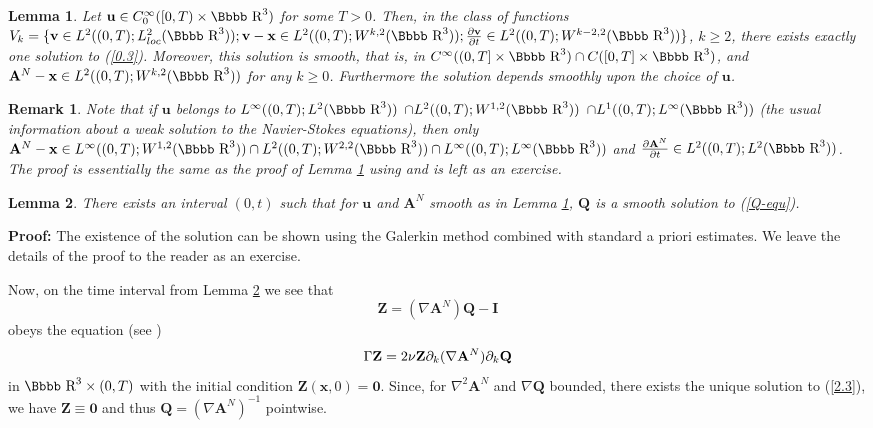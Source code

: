 \documentclass[12pt,twoside]{article}
\newcommand{\bZ}{\mathbf{Z}}
\newcommand{\bA}{\mathbf{A}}
\newtheorem{lema}{Lemma}[section]
\newtheorem{rema}{Remark}[section]
\newcommand {\rdd}{\mbox{\Bbbb R}}
\newcommand {\bnul}{{\mathbf {0}}}
\newcommand {\bv}{{\mathbf{v}}}
\newcommand {\bu}{{\mathbf{u}}}
\newcommand {\bI}{{\mathbf{I}}}
\newcommand {\bx}{{\mathbf{x}}}
\newcommand {\bQ}{{\mathbf{Q}}}
\newcommand {\pder}[2]{\frac {\partial #1}{\partial #2}}
\newcommand {\demo}{{\bf Proof:} }
\def\kondemo{\hfill \vrule width7pt height7pt depth0pt}
\newcommand{\wor}[2]{W^{#1,#2}(\rdd^3)}
\renewcommand{\lor}[1]{L^{#1}(\rdd^3)}
\begin{document}
\begin{lema} \label {l 2.1}
Let $\bu \in C^\infty_0([0,T)\times \rdd^3)$ for some $T>0$. Then,
in the class of functions $V_k= \{\bv \in L^2((0,T); L^{2}_{loc}(\rdd^3)); \bv-\bx
\in L^2((0,T); W^{k,2}(\rdd^3)); \pder{\bv}{t} \in L^2((0,T);
W^{k-2,2} (\rdd^3))\}$, $k\geq 2$, there 
exists exactly one solution to (\ref{0.3}).
Moreover, this solution
is smooth, that is, in $C^\infty((0,T]\times \rdd^3) \cap 
C([0,T]\times \rdd^3)$, 
and $\bA^N-\bx \in L^2((0,T);
\wor{k}{2})$ for any $k\geq 0$.  Furthermore the solution depends smoothly upon
the choice of $\bu$.
\end{lema}

\begin{rema} \label{r 2.1}
{\rm Note that if $\bu$ belongs to $L^\infty((0,T); \lor{2})$ 
$\cap L^2((0,T);
\wor{1}{2})$ $\cap L^1((0,T);
\lor{\infty})$ (the usual information about a weak solution to the 
Navier-Stokes equations), 
then only $\bA^N-\bx \in L^\infty((0,T);
\wor{1}{2}) \cap L^2((0,T);
\wor{2}{2}) \cap L^\infty((0,T);
\lor{\infty})$ and $\pder{\bA^N}{t} \in L^2((0,T);
\lor{2})$. The proof is essentially the same as the proof of Lemma 
\ref{l 2.1} using \cite{LaSoUr} and is left as an exercise. }
\end{rema}  


\begin{lema} \label{l 2.2}
There exists an interval $(0,t)$ such that for $\bu$ and $\bA^N$ smooth as in 
Lemma \ref{l 2.1}, $\bQ$ is a smooth solution to (\ref{Q-equ}).
\end{lema}

\demo The existence of the solution can be shown using the Galerkin
method combined with standard a priori estimates. We leave the details
of the proof to the reader as an exercise. 
\kondemo

\bigskip

Now, on the time interval from Lemma \ref{l 2.2} we see that
$$
\bZ = (\nabla \bA^N) \bQ - \bI
$$
obeys the equation (see \cite{Co})
\begin{equation} \label{2.3}
\Ga \bZ = 2\nu \bZ \partial_k(\nabla \bA^N)\partial_k \bQ
\end{equation}
in $\rdd^3 \times (0,T)$ with the initial condition $\bZ(\bx,0) = \bnul$. Since,
for $\nabla^2 \bA^N$ and $\nabla \bQ$ bounded, there exists the unique solution to   
(\ref{2.3}), we have $\bZ \equiv \bnul$ and thus $\bQ = (\nabla \bA^N)^{-1}$ pointwise.
\end{document}
